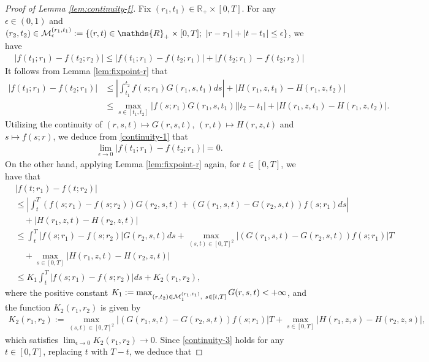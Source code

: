 \documentclass[11pt,times,letter]{article}
\newcommand{\R}{\mathds{R}}
\numberwithin{equation}{section}
\begin{document}
\begin{proof}[Proof of Lemma \ref{lem:continuity-f}]
Fix $(r_1,t_1)\in\R_+\times [0,T]$. For any $\epsilon\in (0,1)$ and $(r_2,t_2)\in {\cal M}^{(r_1,t_1)}_{\epsilon}:=\{(r,t)\in \R_+\times [0,T];~|r-r_1|+|t-t_1|\leq \epsilon\}$, we have
\begin{align}\label{continuity} 
|f(t_1;r_1)-f(t_2;r_2)|\leq |f(t_1;r_1)-f(t_2;r_1)|+|f(t_2;r_1)-f(t_2;r_2)|
\end{align}
It follows from Lemma \ref{lem:fixpoint-r} that
\begin{align}\label{continuity-1}
|f(t_1;r_1)-f(t_2;r_1)|&\leq \left|\int_{t_1}^{t_2} f(s;r_1)G(r_1,s,t_1)ds\right|+\left|H(r_1,z,t_1)-H(r_1,z,t_2)\right|\nonumber\\
&\leq \max_{s\in[t_1,t_2]}|f(s;r_1)G(r_1,s,t_1)||t_2-t_1|+\left|H(r_1,z,t_1)-H(r_1,z,t_2)\right|.
\end{align}
Utilizing the continuity of $(r,s,t)\mapsto G(r,s,t)$, $(r,t)\mapsto H(r,z,t)$ and  $s\mapsto f(s;r)$, we deduce from \eqref{continuity-1} that
\begin{align}\label{continuity-2}
\lim_{\epsilon \to0}|f(t_1;r_1)-f(t_2;r_1)|=0.
\end{align}
On the other hand, applying Lemma \ref{lem:fixpoint-r} again, for $t\in[0,T]$,  we have that
\begin{align}\label{continuity-3}
&|f(t;r_1)-f(t;r_2)|\nonumber\\
&\leq\left|\int_{t}^T (f(s;r_1)-f(s;r_2))G(r_2,s,t)+(G(r_1,s,t)-G(r_2,s,t))f(s;r_1)ds\right|\nonumber\\
&\quad+\left|H(r_1,z,t)-H(r_2,z,t)\right|\nonumber\\
&\leq\int_{t}^T |f(s;r_1)-f(s;r_2)|G(r_2,s,t)ds+\max_{(s,t)\in[0,T]^2}|(G(r_1,s,t)-G(r_2,s,t))f(s;r_1)|T\nonumber\\
&\quad+\max_{s\in[0,T]}\left|H(r_1,z,t)-H(r_2,z,t)\right|\nonumber\\
&\leq K_1\int_{t}^T |f(s;r_1)-f(s;r_2)|ds+K_2(r_1,r_2),
\end{align}
where the positive constant $K_1:=\max_{(r,t_2)\in {\cal M}_1^{(r_1,t_1)},~s\in[t,T]}G(r,s,t)<+\infty$, and the function $K_2(r_1,r_2)$ is given by
\begin{align*}
K_2(r_1,r_2):=\max_{(s,t)\in[0,T]^2}|(G(r_1,s,t)-G(r_2,s,t))f(s;r_1)|T+\max_{s\in[0,T]}\left|H(r_1,z,s)-H(r_2,z,s)\right|,
\end{align*}
which satisfies $\lim_{\epsilon \to 0}K_2(r_1,r_2)\to 0$. Since \eqref{continuity-3} holds for any $t\in[0,T]$, replacing $t$ with $T-t$, we deduce that

\end{proof}
\end{document}
